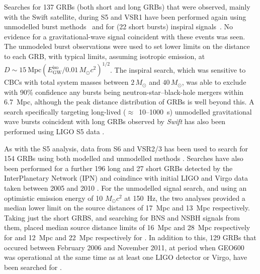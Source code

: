 Searches for 137 GRBs (both short and long GRBs) that were observed, mainly with the Swift satellite, during 
S5 and VSR1 have been performed again using unmodelled burst methods~\cite{Abbott:2009d} and for (22 short 
bursts) inspiral signals~\cite{Abadie:2010b}. No evidence for a gravitational-wave signal coincident with 
these events was seen. The unmodeled burst observations were used to set lower limits on the distance to each 
GRB, with typical limits, assuming isotropic emission, at
$D\sim15\mathrm{\ Mpc}(E^{\mathrm{iso}}_{\mathrm{GW}}/0.01\,M_{\odot}c^2)^{1/2}$. The inspiral search, which 
was sensitive to CBCs with total system masses between $2\,M_{\odot}$ and $40\,M_{\odot}$, was able to 
exclude with 90\% confidence any bursts being neutron-star--black-hole mergers within 6.7~Mpc, although the 
peak distance distribution of GRBs is well beyond this. A search specifically targeting long-lived 
($\approx$~10--1000~s) unmodelled gravitational wave bursts coincident with long GRBs observed by 
\textit{Swift} has also been performed using LIGO S5 data \cite{2013PhRvD..88l2004A}.

As with the S5 analysis, data from S6 and VSR2/3 has been used to search for 154 GRBs using both modelled and 
unmodelled methods \cite{2012ApJ...760...12A}. Searches have also been performed for a further 196 long and 27 
short GRBs detected by the InterPlanetary Network (IPN) \cite{2003AIPC..662..473H} and coindince with initial 
LIGO and Virgo data taken between 2005 and 2010 \cite{2014PhRvL.113a1102A}. For the unmodelled signal 
search, and using an optimistic emission energy of 10 $M_{\odot}c^2$ at 150~Hz, the two analyses 
provided a median lower limit on the source distances of 17~Mpc \cite{2012ApJ...760...12A} and 13~Mpc 
\cite{2014PhRvL.113a1102A} respectively. Taking just the short GRBS, and searching for BNS and NSBH 
signals from them, placed median source distance limits of 16~Mpc and 28~Mpc respectively for 
\cite{2012ApJ...760...12A} and 12~Mpc and 22~Mpc respectively for \cite{2014PhRvL.113a1102A}. In addition to 
this, 129 GRBs that occured between February 2006 and November 2011, at period when GEO600 was operational at 
the same time as at least one LIGO detector or Virgo, have been searched for \cite{2014PhRvD..89l2004A}.

